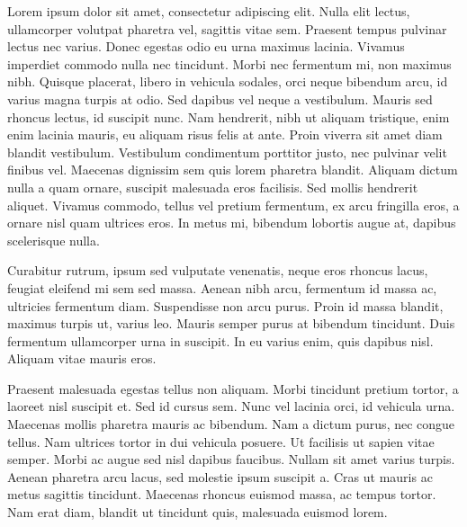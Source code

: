 Lorem ipsum dolor sit amet, consectetur adipiscing elit. Nulla elit lectus, ullamcorper volutpat pharetra vel, sagittis vitae sem. Praesent tempus pulvinar lectus nec varius. Donec egestas odio eu urna maximus lacinia. Vivamus imperdiet commodo nulla nec tincidunt. Morbi nec fermentum mi, non maximus nibh. Quisque placerat, libero in vehicula sodales, orci neque bibendum arcu, id varius magna turpis at odio. Sed dapibus vel neque a vestibulum. Mauris sed rhoncus lectus, id suscipit nunc. Nam hendrerit, nibh ut aliquam tristique, enim enim lacinia mauris, eu aliquam risus felis at ante. Proin viverra sit amet diam blandit vestibulum. Vestibulum condimentum porttitor justo, nec pulvinar velit finibus vel. Maecenas dignissim sem quis lorem pharetra blandit. Aliquam dictum nulla a quam ornare, suscipit malesuada eros facilisis. Sed mollis hendrerit aliquet. Vivamus commodo, tellus vel pretium fermentum, ex arcu fringilla eros, a ornare nisl quam ultrices eros. In metus mi, bibendum lobortis augue at, dapibus scelerisque nulla.

Curabitur rutrum, ipsum sed vulputate venenatis, neque eros rhoncus lacus, feugiat eleifend mi sem sed massa. Aenean nibh arcu, fermentum id massa ac, ultricies fermentum diam. Suspendisse non arcu purus. Proin id massa blandit, maximus turpis ut, varius leo. Mauris semper purus at bibendum tincidunt. Duis fermentum ullamcorper urna in suscipit. In eu varius enim, quis dapibus nisl. Aliquam vitae mauris eros.

Praesent malesuada egestas tellus non aliquam. Morbi tincidunt pretium tortor, a laoreet nisl suscipit et. Sed id cursus sem. Nunc vel lacinia orci, id vehicula urna. Maecenas mollis pharetra mauris ac bibendum. Nam a dictum purus, nec congue tellus. Nam ultrices tortor in dui vehicula posuere. Ut facilisis ut sapien vitae semper. Morbi ac augue sed nisl dapibus faucibus. Nullam sit amet varius turpis. Aenean pharetra arcu lacus, sed molestie ipsum suscipit a. Cras ut mauris ac metus sagittis tincidunt. Maecenas rhoncus euismod massa, ac tempus tortor. Nam erat diam, blandit ut tincidunt quis, malesuada euismod lorem.